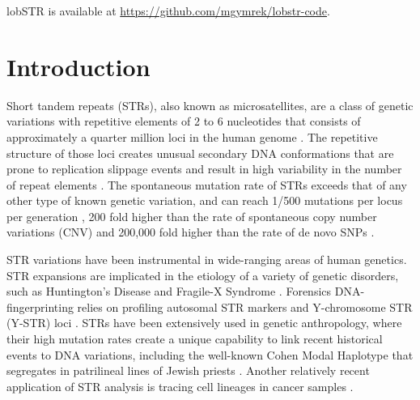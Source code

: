 lobSTR is available at \url{https://github.com/mgymrek/lobstr-code}.

\section{Introduction}
Short tandem repeats (STRs), also known as microsatellites, are a class of genetic variations with repetitive elements of 2 to 6 nucleotides that consists of approximately a quarter million loci in the human genome \cite{Benson1999}. The repetitive structure of those loci creates unusual secondary DNA conformations that are prone to replication slippage events and result in high variability in the number of repeat elements \cite{Mirkin2007}. The spontaneous mutation rate of STRs exceeds that of any other type of known genetic variation, and can reach 1/500 mutations per locus per generation \cite{Walsh2001,BallantyneGoedbloedFangEtAl2010}, 200 fold higher than the rate of spontaneous copy number variations (CNV) \cite{Lupski2007} and 200,000 fold higher than the rate of de novo SNPs \cite{ConradKeeblerDePristoEtAl2011}.

STR variations have been instrumental in wide-ranging areas of human genetics. STR expansions are implicated in the etiology of a variety of genetic disorders, such as Huntington's Disease and Fragile-X Syndrome \cite{PearsonNicholEdamuraCleary2005,Mirkin2007}. Forensics DNA-fingerprinting relies on profiling autosomal STR markers and Y-chromosome STR (Y-STR) loci \cite{KayserKnijff2011}. STRs have been extensively used in genetic anthropology, where their high mutation rates create a unique capability to link recent historical events to DNA variations, including the well-known Cohen Modal Haplotype that segregates in patrilineal lines of Jewish priests \cite{SkoreckiSeligBlazerEtAl1997,ZhivotovskyUnderhillCinniogluEtAl2004}. Another relatively recent application of STR analysis is tracing cell lineages in cancer samples \cite{FrumkinWasserstromItzkovitzEtAl2008}.

